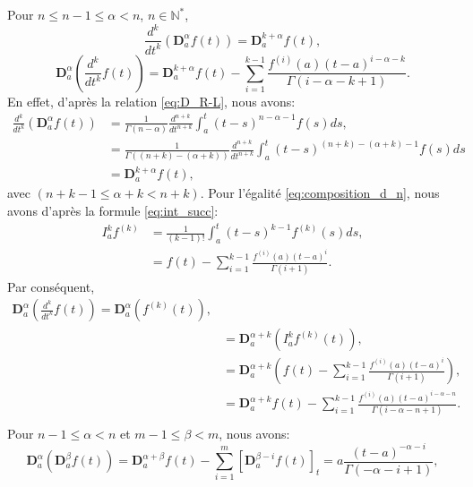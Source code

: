 Pour $n \leq n-1 \leq \alpha < n$, $n\in \mathbb{N^*}$,
\begin{equation}
    \frac{d^k}{dt^k} \left( \textbf{D}_a^{\alpha} f(t) \right) = \textbf{D}_a^{k+\alpha} f(t),
\end{equation}
\begin{equation}\label{eq:composition_d_n}
    \textbf{D}_a^{\alpha}\left(\frac{d^k}{dt^k}f(t) \right)=\textbf{D}_a^{k+\alpha}f(t) - \sum _{i=1}^{k-1}\frac{f^{(i)}(a) (t-a)^{i-\alpha -k}}{\Gamma(i-\alpha-k+1)}.
\end{equation}
En effet, d'après la relation \ref{eq:D_R-L}, nous avons:
\begin{align*}
    \frac{d^k}{dt^k} \left( \textbf{D}_a^{\alpha} f(t) \right) &= \frac{1}{\Gamma(n-\alpha)} \frac{d^{n+k}}{dt^{n+k}} \int_a^t (t-s)^{n-\alpha-1} f(s)ds,\\
    &= \frac{1}{\Gamma((n+k)-(\alpha +k))} \frac{d^{n+k}}{dt^{n+k}}\int _a^t (t-s)^{(n+k)-(\alpha +k)-1}f(s)ds\\
    &= \textbf{D}_a^{k+\alpha} f(t),
\end{align*}
avec $(n+k-1\leq \alpha + k <n+k)$.
Pour l'égalité \ref{eq:composition_d_n}, nous avons d'après la formule \ref{eq:int_succ}:
\begin{align*}
    I_a^k f^{(k)} &= \frac{1}{(k-1)!}\int_a^t (t-s)^{k-1} f^{(k)} (s) ds,\\
    &= f(t) -\sum_{i=1}^{k-1} \frac{f^{(i)} (a) (t-a)^i}{\Gamma(i+1)}.
\end{align*}
Par conséquent, 
\begin{align*}
    \textbf{D}_a^{\alpha} \left(\frac{d^k}{dt^k}f(t) \right) = \textbf{D}_a^{\alpha}\left(f^{(k)}(t) \right),\\
    &= \textbf{D}_a^{\alpha+k} \left(I_a^k f^{(k)}(t) \right),\\
    &= \textbf{D}_a^{\alpha +k} \left(f(t) -\sum_{i=1}^{k-1} \frac{f^{(i)}(a)(t-a)^i}{\Gamma(i+1)} \right),\\
    &= \textbf{D}_a^{\alpha +k} f(t) -\sum_{i=1}^{k-1} \frac{f^{(i)}(a)(t-a)^{i-\alpha-n}}{\Gamma(i-\alpha -n +1)}.\\
\end{align*}
Pour $n-1\leq \alpha <n$ et $m-1\leq \beta <m$, nous avons:
\begin{equation}
    \textbf{D}_a^{\alpha} \left(\textbf{D}_a^{\beta} f(t) \right) = \mathbf{D}_a^{\alpha+\beta}f(t) -\sum_{i=1}^m [\textbf{D}_a^{\beta -i} f(t)]_t=a \frac{(t-a)^{-\alpha-i}}{\Gamma(-\alpha -i +1)},
\end{equation}
